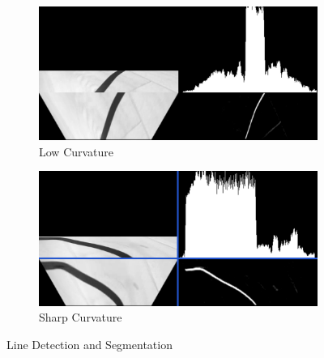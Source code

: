         \begin{figure}[H]
            \centering
            \begin{subfigure}[b]{0.45\textwidth}
                \includegraphics[width=\textwidth]{vizSmallCurve.png}
                \caption{Low Curvature}
                \label{fig:LineDetection}
            \end{subfigure}
            \hfill
            \begin{subfigure}[b]{0.45\textwidth}
                \includegraphics[width=\textwidth]{vizBigCurve.png}
                \caption{Sharp Curvature}
                \label{fig:LineSegmentation}
            \end{subfigure}
            \caption{Line Detection and Segmentation}   
        \end{figure}

